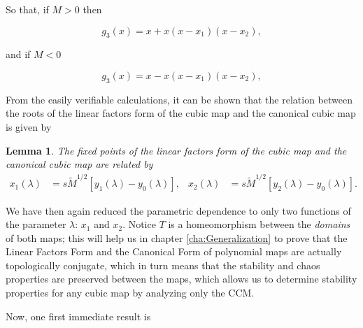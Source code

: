 \documentclass[10pt,twoside,titlepage]{book}
\numberwithin{equation}{chapter}
\numberwithin{figure}{chapter}
\numberwithin{table}{chapter}
\theoremstyle{plain}%
\newtheorem{lem}[thm]{Lemma}
\theoremstyle{definition}
\theoremstyle{remark}
\begin{document}
So that, if $M>0$ then

\begin{equation}
	g_3(x)=x+x(x-x_1)(x-x_2),
\end{equation}

and if $M<0$

\begin{equation}
	g_3(x)=x-x(x-x_1)(x-x_2),
\end{equation}

From the easily verifiable calculations, it can be shown that the relation between the roots of the linear factors form of the cubic map and the canonical cubic map is given by

\begin{lem}
	The fixed points of the linear factors form of the cubic map and the canonical cubic map are related by
	\begin{equation}
		\begin{aligned}
			x_1(\lambda)&=s\tilde{M}^{1/2}\left[y_1(\lambda)-y_0(\lambda)\right],
			& x_2(\lambda)&=s\tilde{M}^{1/2}\left[y_2(\lambda)-y_0(\lambda)\right].
		\end{aligned}
	\end{equation}
\end{lem}

We have then again reduced the parametric dependence to only two functions of the parameter $\lambda$: $x_1$ and $x_2$. Notice $T$ is a homeomorphism between the \emph{domains} of both maps; this will help us in chapter \ref{cha:Generalization} to prove that the Linear Factors Form and the Canonical Form of polynomial maps are actually topologically conjugate, which in turn means that the stability and chaos properties are preserved between the maps, which allows us to determine stability properties for any cubic map by analyzing only the CCM.

Now, one first immediate result is
\end{document}
